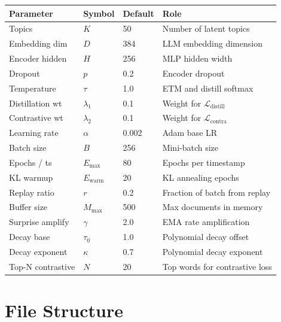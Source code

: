 \documentclass[11pt,a4paper]{article}
\begin{document}
\begin{center}
\begin{tabular}{llll}
\toprule
Parameter & Symbol & Default & Role \\
\midrule
Topics           & $K$               & 50    & Number of latent topics \\
Embedding dim    & $D$               & 384   & LLM embedding dimension \\
Encoder hidden   & $H$               & 256   & MLP hidden width \\
Dropout          & $p$               & 0.2   & Encoder dropout \\
Temperature      & $\tau$            & 1.0   & ETM and distill softmax \\
Distillation wt  & $\lambda_1$       & 0.1   & Weight for $\mathcal{L}_\text{distill}$ \\
Contrastive wt   & $\lambda_2$       & 0.1   & Weight for $\mathcal{L}_\text{contra}$ \\
Learning rate    & $\alpha$          & 0.002 & Adam base LR \\
Batch size       & $B$               & 256   & Mini-batch size \\
Epochs / ts      & $E_\text{max}$    & 80    & Epochs per timestamp \\
KL warmup        & $E_\text{warm}$   & 20    & KL annealing epochs \\
Replay ratio     & $r$               & 0.2   & Fraction of batch from replay \\
Buffer size      & $M_\text{max}$    & 500   & Max documents in memory \\
Surprise amplify & $\gamma$          & 2.0   & EMA rate amplification \\
Decay base       & $\tau_0$          & 1.0   & Polynomial decay offset \\
Decay exponent   & $\kappa$          & 0.7   & Polynomial decay exponent \\
Top-N contrastive& $N$               & 20    & Top words for contrastive loss \\
\bottomrule
\end{tabular}
\end{center}

\section{File Structure}
\end{document}

